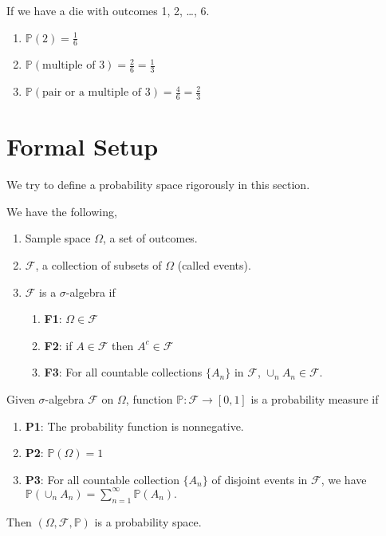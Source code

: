 \begin{example}
If we have a die with outcomes 1, 2, \ldots, 6. 
\begin{enumerate}
    \item $\mathbb{P}(2) = \frac{1}{6}$
    \item $\mathbb{P}(\text{multiple of }3) = \frac{2}{6} = \frac{1}{3}$
    \item \(\mathbb{P}(\text{pair or a multiple of }3) = \frac{4}{6} = \frac{2}{3}\) 
\end{enumerate}
\end{example}
\section{Formal Setup}
We try to define a probability space rigorously in this section.
\begin{definition}
    We have the following,
    \begin{enumerate}
        \item Sample space \(\Omega\), a set of outcomes.
        \item \(\mathcal{F}\), a collection of subsets of \(\Omega\) (called events).
        \item \(\mathcal{F}\) is a \(\sigma\)-algebra if
        \begin{enumerate}
            \item \textbf{F1}: \(\Omega\in\mathcal{F} \)
            \item \textbf{F2}: if \(A \in \mathcal{F} \) then \(A^c \in \mathcal{F} \)
            \item \textbf{F3}: For all countable collections \(\{A_n\}\) in \(\mathcal{F} \), \(\cup_n A_n \in \mathcal{F} \).
        \end{enumerate} 
    \end{enumerate}
    Given \(\sigma\)-algebra \(\mathcal{F}\) on \(\Omega\), function $\mathbb{P}: \mathcal{F} \to [0,1]$ is a probability measure if
    \begin{enumerate}
        \item \textbf{P1}: The probability function is nonnegative.
        \item \textbf{P2}: \(\mathbb{P}(\Omega) = 1\) 
        \item \textbf{P3}: For all countable collection \(\{A_n\}\) of disjoint events in \(\mathcal{F} \), we have
        \(
            \mathbb{P}(\cup_n A_n) = \sum\limits_{n=1}^{\infty} \mathbb{P}(A_n).
        \)
    \end{enumerate}
    Then \((\Omega, \mathcal{F}, \mathbb{P})\) is a probability space. 
\end{definition}

